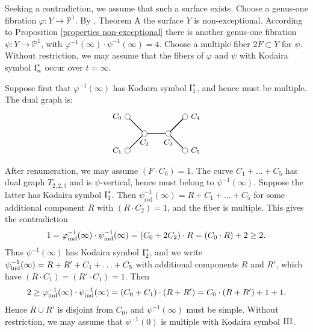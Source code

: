 \documentclass[oneside, 12pt]{amsart}
\theoremstyle{definition}
\theoremstyle{remark}
\newcommand{\PP}{\mathbb{P}}
\newcommand{\I}{\text{\rm I}}
\newcommand{\III}{\text{\rm III}}
\newcommand{\ra}{\rightarrow}
\newcommand{\red}{{\operatorname{red}}}
\newcommand{\ind}{\text{\rm ind}}
\newcommand{\inv}{{-1}}
\begin{document}
\proof 
Seeking a contradiction, we assume that such a surface exists. Choose a genus-one fibration $\varphi:Y\ra \PP^1$.
By \cite{Ekedahl; Shepherd-Barron 2004}, Theorem A the surface $Y$ is non-exceptional.
According to Proposition \ref{properties non-exceptional} there is another genus-one fibration $\psi:Y\ra\PP^1$,
with $\varphi^\inv(\infty)\cdot\psi^\inv(\infty)=4$. Choose a multiple fiber  $2F\subset Y$ for   $\psi$.
Without restriction, we may assume that the fibers of $\varphi$ and $\psi$ with Kodaira symbol $\I_n^*$ occur over
$t=\infty$. 

Suppose first that $\varphi^\inv(\infty)$ has Kodaira symbol $\I_1^*$, and hence must be multiple. The dual graph is:
\begin{equation*}
\begin{gathered}
\begin{tikzpicture}
[node distance=1cm, font=\small]
\tikzstyle{vertex}=[circle, draw, fill=white, inner sep=0mm, minimum size=1.5ex]
\node[vertex]	(C2)  	at (1,0) [			label=below:{$C_2$}]	{};
\node[vertex]	(C3)	[right of=C2, 		label=below:{$C_3$}]	{};
\node[vertex]	(C4)	[above right of=C3, label=right:{$C_4$}]	{};
\node[vertex]	(C5)	[below right of=C3, label=right:{$C_5$}]	{};
\node[vertex]	(C0)	[above left of=C2, 	label=left :{$C_0$}]	{};
\node[vertex]	(C1)	[below left of=C2, 	label=left :{$C_1$}]	{};
 
\draw [thick] (C2)--(C3)--(C4);
\draw [thick] (C0)--(C2)--(C1);
\draw [thick] (C5)--(C3)--(C4);
\end{tikzpicture}
\end{gathered}
\end{equation*}
After renumeration, we may assume $(F\cdot C_0)=1$. The curve $C_1+\ldots +C_5$ has dual graph 
$T_{2,2,3}$ and is $\psi$-vertical, hence must belong to $\psi^\inv(\infty)$. Suppose the latter has Kodaira symbol
$\I_1^*$. Then $\psi^{-1}_\red(\infty)=R+C_1+\ldots+C_5$ for some additional component 
$R$ with $(R\cdot C_2)=1$, and the fiber is multiple. This gives the contradiction
$$
1=\varphi^\inv_\ind(\infty)\cdot\psi^\inv_\ind(\infty) = (C_0+2C_2)\cdot R = (C_0\cdot R) + 2\geq 2.
$$
Thus $\psi^\inv(\infty)$ has Kodaira symbol $\I_2^*$, and we write $\psi^\inv_\ind(\infty)=R+R'+C_1+\ldots+C_5$
with additional components $R$ and $R'$, which have  $(R\cdot C_1)=(R'\cdot C_1)=1$. Then
$$
2\geq \varphi^\inv_\ind(\infty)\cdot\psi^\inv_\ind(\infty) = (C_0+C_1)\cdot (R+R') = C_0\cdot(R+R')  + 1+1.
$$
Hence $R\cup R'$ is disjoint from $C_0$, and $\psi^\inv(\infty)$ must be simple. 
Without restriction, we may assume that $\psi^\inv(0)$ is multiple with Kodaira symbol $\III$.
\end{document}
